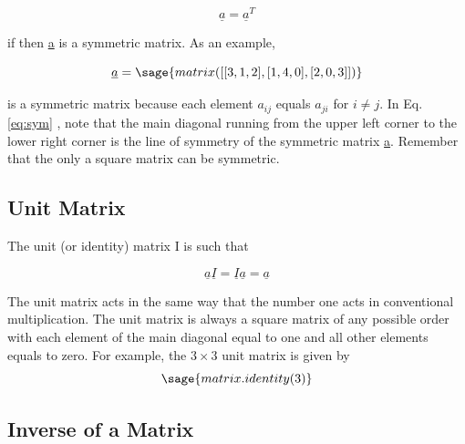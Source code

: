 \documentclass[12pt]{report}
\newcommand{\eref}[1]{
	Eq.\ref{#1}
}
\begin{document}
\begin{equation}
	\underline{a} = \underline{a}^T
\end{equation}

 if then \underline{a} is a symmetric matrix. As an
example,

\begin{equation}
	\underline{a}=\sage{matrix([[3,1,2],[1,4,0],[2,0,3]])}
	\label{eq:sym}
\end{equation}

is a symmetric matrix because each element $a_{{ij}}$ equals $a_{{ji}}$ for 
$i \neq j$. In \eref{eq:sym}, note that the main diagonal running from the
upper left corner to the lower right corner is the line of symmetry of
the symmetric matrix \underline{a}. Remember that the only a square
matrix can be symmetric.


\subsection{Unit Matrix}

The unit (or identity) matrix I is such that

\begin{equation}
	\underline{a}\underline{I}=\underline{I}\underline{a}=\underline{a}
\end{equation}

The unit matrix acts in the same way that the number one acts in
conventional multiplication. The unit matrix is always a square matrix
of any possible order with each element of the main diagonal equal to
one and all other elements equals to zero. For example, the $3 \times 3$
unit matrix is given by
\begin{equation}
	\sage{matrix.identity(3)}
\end{equation}


\subsection{Inverse of a Matrix}
\end{document}
